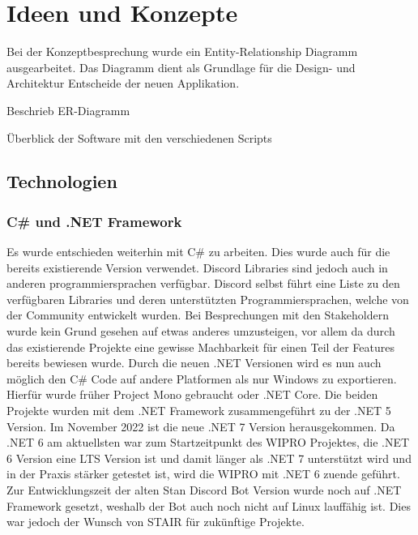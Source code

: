 \documentclass[a4paper, table]{article}
\begin{document}
\newpage
\section{Ideen und Konzepte}

Bei der Konzeptbesprechung wurde ein Entity-Relationship Diagramm ausgearbeitet. Das Diagramm dient als Grundlage für die Design-
und Architektur Entscheide der neuen Applikation.

Beschrieb ER-Diagramm


Überblick der Software mit den verschiedenen Scripts

\subsection{Technologien}

\subsubsection{C\# und .NET Framework}

Es wurde entschieden weiterhin mit C\# zu arbeiten.
Dies wurde auch für die bereits existierende Version verwendet.
Discord Libraries sind jedoch auch in anderen programmiersprachen verfügbar.
Discord selbst führt eine Liste zu den verfügbaren Libraries und deren unterstützten Programmiersprachen, welche von der Community entwickelt wurden.\autocite{noauthor_discord_2022-1}
Bei Besprechungen mit den Stakeholdern wurde kein Grund gesehen auf etwas anderes umzusteigen, vor allem da durch das existierende Projekte eine gewisse Machbarkeit für einen Teil der Features bereits bewiesen wurde.
Durch die neuen .NET Versionen wird es nun auch möglich den C\# Code auf andere Platformen als nur Windows zu exportieren.
Hierfür wurde früher Project Mono gebraucht oder .NET Core.
Die beiden Projekte wurden mit dem .NET Framework zusammengeführt zu der .NET 5 Version.\autocite{schwichtenberg_net_2019}
Im November 2022 ist die neue .NET 7 Version herausgekommen.
Da .NET 6 am aktuellsten war zum Startzeitpunkt des WIPRO Projektes, die .NET 6 Version eine LTS Version ist und damit länger als .NET 7 unterstützt wird und in der Praxis stärker getestet ist, wird die WIPRO mit .NET 6 zuende geführt.\autocite{noauthor_net_2022}
Zur Entwicklungszeit der alten Stan Discord Bot Version wurde noch auf .NET Framework gesetzt, weshalb der Bot auch noch nicht auf Linux lauffähig ist.
Dies war jedoch der Wunsch von STAIR für zukünftige Projekte.
\end{document}
